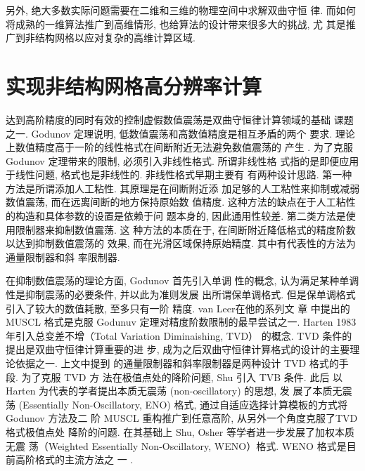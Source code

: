 另外, 绝大多数实际问题需要在二维和三维的物理空间中求解双曲守恒
律. 而如何将成熟的一维算法推广到高维情形, 也给算法的设计带来很多大的挑战, 尤
其是推广到非结构网格以应对复杂的高维计算区域.


\section{实现非结构网格高分辨率计算}
\label{sec:unstru-cfd}

达到高阶精度的同时有效的控制虚假数值震荡是双曲守恒律计算领域的基础
课题之一. Godunov 定理说明, 低数值震荡和高数值精度是相互矛盾的两个
要求. 理论上数值精度高于一阶的线性格式在间断附近无法避免数值震荡的
产生 \cite{Godunov1959,engquist1981}.
为了克服 Godunov 定理带来的限制, 必须引入非线性格式. 所谓非线性格
式指的是即便应用于线性问题, 格式也是非线性的. 非线性格式早期主要有
有两种设计思路. 第一种方法是所谓添加人工粘性. 其原理是在间断附近添
加足够的人工粘性来抑制或减弱数值震荡, 而在远离间断的地方保持原始数
值精度. 这种方法的缺点在于人工粘性的构造和具体参数的设置是依赖于问
题本身的, 因此通用性较差. 第二类方法是使用限制器来抑制数值震荡. 这
种方法的本质在于, 在间断附近降低格式的精度阶数以达到抑制数值震荡的
效果, 而在光滑区域保持原始精度. 其中有代表性的方法为通量限制器和斜
率限制器\cite{HARTEN1972568,Harten1983,Sweby1984,Leer1979}.

在抑制数值震荡的理论方面, Godunov \cite{Godunov1959} 首先引入单调
性的概念, 认为满足某种单调性是抑制震荡的必要条件, 并以此为准则发展
出所谓保单调格式. 但是保单调格式引入了较大的数值耗散, 至多只有一阶
精度. van Leer在他的系列文
章\cite{Leer1973,VANLEER1974361,VanLeer1977263,Leer1977,Leer1979}
中提出的 MUSCL 格式是克服 Godunuv 定理对精度阶数限制的最早尝试之一.
Harten \cite{Harten1983} 1983年引入总变差不增（Total Variation
Diminaishing, TVD） 的概念. TVD 条件的提出是双曲守恒律计算重要的进
步, 成为之后双曲守恒律计算格式的设计的主要理论依据之一. 上文中提到
的通量限制器和斜率限制器是两种设计 TVD 格式的手段. 为了克服 TVD 方
法在极值点处的降阶问题, Shu \cite{Shu1987} 引入 TVB 条件. 此后
以 Harten 为代表的学者提出本质无震荡 (non-oscillatory) 的思想, 发
展了本质无震荡 \cite{Harten1987231} (Essentially Non-Oscillatory,
ENO) 格式, 通过自适应选择计算模板的方式将 Godunov 方法及二
阶 MUSCL 重构推广到任意高阶, 从另外一个角度克服了TVD 格式极值点处
降阶的问题. 在其基础上 Shu, Osher 等学者进一步发展了加权本质无震
荡\cite{Liu1994200,Jiang1996}（Weighted Essentially
Non-Oscillatory, WENO）格式. WENO 格式是目前高阶格式的主流方法之
一 \cite{Wang2007}.


